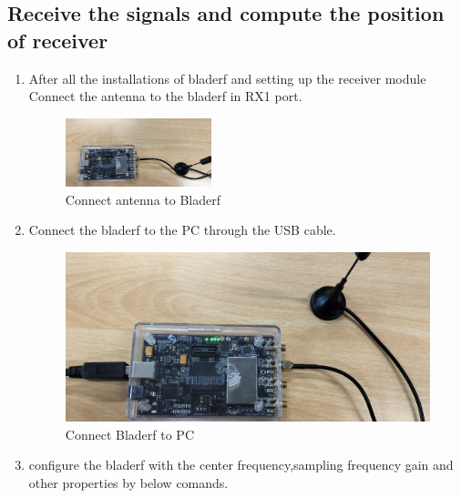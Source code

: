 \subsection{Receive the signals and compute the position of receiver}
\begin{enumerate}
    \item After all the installations of bladerf and setting up the receiver module Connect the antenna to the bladerf in RX1 port.
    \begin{normalsize}
        \begin{figure}[!ht]
            \centering
            \includegraphics[width=0.4\textwidth]{figs/bladerf_antenna.png}
            \centering
            \captionsetup{justification=centering}
            \caption{Connect antenna to Bladerf}
            \end{figure}
        \end{normalsize}
    \item Connect the bladerf to the PC through the USB cable.
    \begin{normalsize}
        \begin{figure}[!ht]
            \centering
            \includegraphics[width=1\textwidth]{figs/bladerf_USB.png}
            \centering
            \captionsetup{justification=centering}
            \caption{Connect Bladerf to PC}
            \end{figure}
        \end{normalsize}
    \item configure the bladerf with the center frequency,sampling frequency gain and other properties by below comands.
    \begin{lstlisting}

\end{lstlisting}
\end{enumerate}
